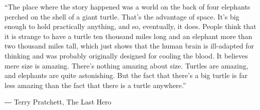 

\begin{cvparagraph}

“The place where the story happened was a world on the back of four elephants perched on the shell of a giant turtle. That's the advantage of space. It's big enough to hold practically anything, and so, eventually, it does.
People think that it is strange to have a turtle ten thousand miles long and an elephant more than two thousand miles tall, which just shows that the human brain is ill-adapted for thinking and was probably originally designed for cooling the blood. It believes mere size is amazing.
There's nothing amazing about size. Turtles are amazing, and elephants are quite astonishing. But the fact that there's a big turtle is far less amazing than the fact that there is a turtle anywhere.”

― Terry Pratchett, The Last Hero
\end{cvparagraph}
